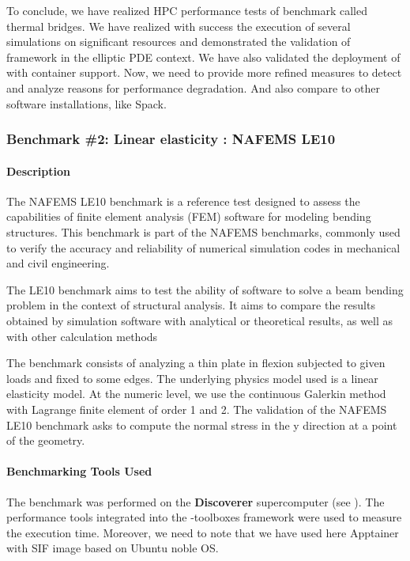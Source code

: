 To conclude, we have realized HPC performance tests of benchmark called thermal
bridges. We have realized with success the execution of several simulations on
significant resources and demonstrated the validation of \Feelpp framework in the
elliptic PDE context. We have also validated the deployment of \Feelpp with
container support. Now, we need to provide more refined measures to detect and
analyze reasons for performance degradation. And also compare to other software
installations, like Spack.



\subsubsection{Benchmark \#2: Linear elasticity : NAFEMS LE10}

\paragraph{Description}
The NAFEMS LE10 benchmark is a reference test designed to assess the
capabilities of finite element analysis (FEM) software for modeling bending
structures. This benchmark is part of the NAFEMS benchmarks, commonly used to
verify the accuracy and reliability of numerical simulation codes in mechanical
and civil engineering.

The LE10 benchmark aims to test the ability of software to solve a beam bending
problem in the context of structural analysis. It aims to compare the results
obtained by simulation software with analytical or theoretical results, as well
as with other calculation methods

The benchmark consists of analyzing a thin plate in flexion subjected to given
loads and fixed to some edges. The underlying physics model used is a linear
elasticity model. At the numeric level, we use the continuous Galerkin method
with Lagrange finite element of order 1 and 2. The validation of the NAFEMS LE10
benchmark asks to compute the normal stress in the y direction at a point of the geometry.


\paragraph{Benchmarking Tools Used}
The benchmark was performed on the \textbf{Discoverer} supercomputer (see
).
The performance tools integrated into the \Feelpp-toolboxes framework were used to measure
the execution time.
Moreover, we need to note that we have used here Apptainer with \Feelpp SIF image based on Ubuntu noble OS.

